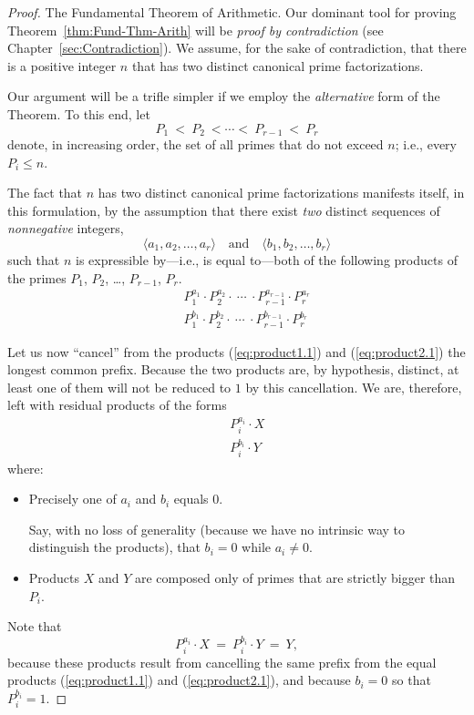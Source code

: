 \begin{proof}
{\small\sf The Fundamental Theorem of Arithmetic.}
%
Our dominant tool for proving Theorem~\ref{thm:Fund-Thm-Arith} will be
{\em proof by contradiction} (see Chapter~\ref{sec:Contradiction}).
We assume, for the sake of contradiction, that there is a positive
integer $n$ that has two distinct canonical prime factorizations.

Our argument will be a trifle simpler if we employ the {\em alternative} 
form of the Theorem.  To this end, let
\[ P_1 \ < \ P_2 \ < \cdots < \ P_{r-1} \ < \ P_r \]
denote, in increasing order, the set of all primes that do not exceed
$n$; i.e., every $P_i \leq n$.

The fact that $n$ has two distinct canonical prime factorizations
manifests itself, in this formulation, by the assumption that there
exist {\em two} distinct sequences of {\em nonnegative} integers, 
\[ \langle a_1, a_2, \ldots, a_r \rangle \ \ \ \mbox{ and } \ \ \
\langle b_1, b_2, \ldots, b_r \rangle 
\]
such that $n$ is expressible by---i.e., is equal to---both of the
following products of the primes $P_1$, $P_2$, \ldots, $P_{r-1}$, $P_r$.
\begin{eqnarray}
 & & 
\label{eq:product1.1}
P_1^{a_1} \cdot P_2^{a_2} \cdot \ \cdots \ \cdot P_{r-1}^{a_{r-1}}
\cdot P_r^{a_r} \\
 & &
\label{eq:product2.1}
P_1^{b_1} \cdot P_2^{b_2} \cdot \ \cdots \ \cdot P_{r-1}^{b_{r-1}}
\cdot P_r^{b_r}
\end{eqnarray}

Let us now ``cancel'' from the products (\ref{eq:product1.1}) and
(\ref{eq:product2.1}) the longest common prefix.  Because the two
products are, by hypothesis, distinct, at least one of them will not
be reduced to $1$ by this cancellation.  We are, therefore, left with
residual products of the forms
\begin{eqnarray}
 & &
\label{eq:product1.2}
P_i^{a_i} \cdot X \\
 & &
\label{eq:product2.2}
P_i^{b_i} \cdot Y
\end{eqnarray}
where:
\begin{itemize}
\item
Precisely one of $a_i$ and $b_i$ equals $0$.

Say, with no loss of generality (because we have no intrinsic way to
distinguish the products), that $b_i =0$ while $a_i \neq 0$.

\item
Products $X$ and $Y$ are composed only of primes that are strictly
bigger than $P_i$.
\end{itemize}
Note that 
\[ P_i^{a_i} \cdot X \ = \ P_i^{b_i} \cdot Y \ = \ Y, \]
because these products result from cancelling the same prefix from the
equal products (\ref{eq:product1.1}) and (\ref{eq:product2.1}), and
because $b_i =0$ so that $P_i^{b_i} = 1$.


\end{proof}
